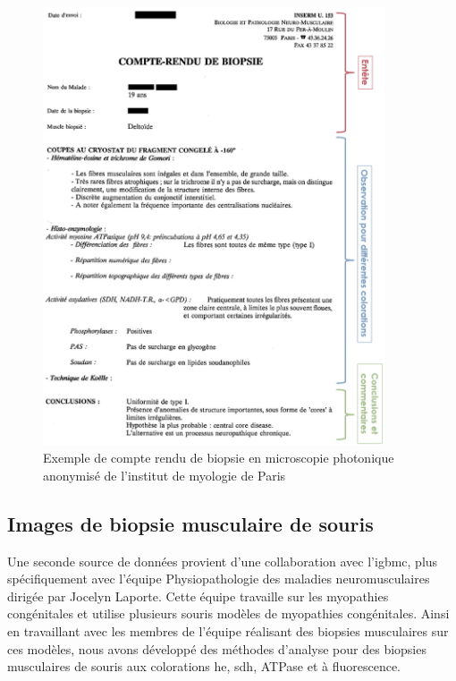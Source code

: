 \begin{figure}[!ht]
 \centering
 \includegraphics[width=0.9\textwidth]{figures/compte_rendu_exemple.png}
 \caption[Exemple de compte rendu de biopsie]{Exemple de compte rendu de biopsie en microscopie photonique anonymisé de l'institut de myologie de Paris}
 \label{fig:compte-rendu-exemple}
\end{figure}

\subsection{Images de biopsie musculaire de souris}
Une seconde source de données provient d'une collaboration avec l'\gls{igbmc}, plus spécifiquement avec l'équipe Physiopathologie des maladies neuromusculaires dirigée par Jocelyn Laporte. Cette équipe travaille sur les myopathies congénitales et utilise plusieurs souris modèles de myopathies congénitales. Ainsi en travaillant avec les membres de l'équipe réalisant des biopsies musculaires sur ces modèles, nous avons développé des méthodes d'analyse pour des biopsies musculaires de souris aux colorations \gls{he}, \gls{sdh}, ATPase et à fluorescence.

